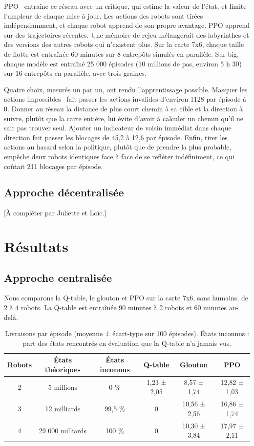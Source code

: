\documentclass[11pt,a4paper]{article}
\begin{document}
PPO~\cite{schulman2017} entraîne ce réseau avec un critique, qui estime la valeur de l'état, et limite l'ampleur de chaque mise à jour. Les actions des robots sont tirées indépendamment, et chaque robot apprend de son propre avantage. PPO apprend sur des trajectoires récentes. Une mémoire de rejeu mélangerait des labyrinthes et des versions des autres robots qui n'existent plus. Sur la carte 7x6, chaque taille de flotte est entraînée 60 minutes sur 8 entrepôts simulés en parallèle. Sur big, chaque modèle est entraîné 25 000 épisodes (10 millions de pas, environ 5 h 30) sur 16 entrepôts en parallèle, avec trois graines.

Quatre choix, mesurés un par un, ont rendu l'apprentissage possible. Masquer les actions impossibles~\cite{huang2022} fait passer les actions invalides d'environ 1128 par épisode à 0. Donner au réseau la distance de plus court chemin à sa cible et la direction à suivre, plutôt que la carte entière, lui évite d'avoir à calculer un chemin qu'il ne sait pas trouver seul. Ajouter un indicateur de voisin immédiat dans chaque direction fait passer les blocages de 45,2 à 12,6 par épisode. Enfin, tirer les actions au hasard selon la politique, plutôt que de prendre la plus probable, empêche deux robots identiques face à face de se refléter indéfiniment, ce qui coûtait 211 blocages par épisode.

\subsection{Approche décentralisée}

[À compléter par Juliette et Loïc.]


\section{Résultats}

\subsection{Approche centralisée}

Nous comparons la Q-table, le glouton et PPO sur la carte 7x6, sans humains, de 2 à 4 robots. La Q-table est entraînée 90 minutes à 2 robots et 60 minutes au-delà.

\begin{table}[htbp]
\centering
\begin{tabular}{cccccc}
\hline
Robots & États théoriques & États inconnus & Q-table & Glouton & PPO \\
\hline
2 & 5 millions & 0 \% & 1,23 ± 2,05 & 8,57 ± 1,74 & 12,82 ± 1,03 \\
3 & 12 milliards & 99,5 \% & 0 & 10,56 ± 2,56 & 16,86 ± 1,74 \\
4 & 29 000 milliards & 100 \% & 0 & 10,30 ± 3,84 & 17,97 ± 2,11 \\
\hline
\end{tabular}
\caption{Livraisons par épisode (moyenne ± écart-type sur 100 épisodes). États inconnus : part des états rencontrés en évaluation que la Q-table n'a jamais vus.}
\end{table}
\end{document}
